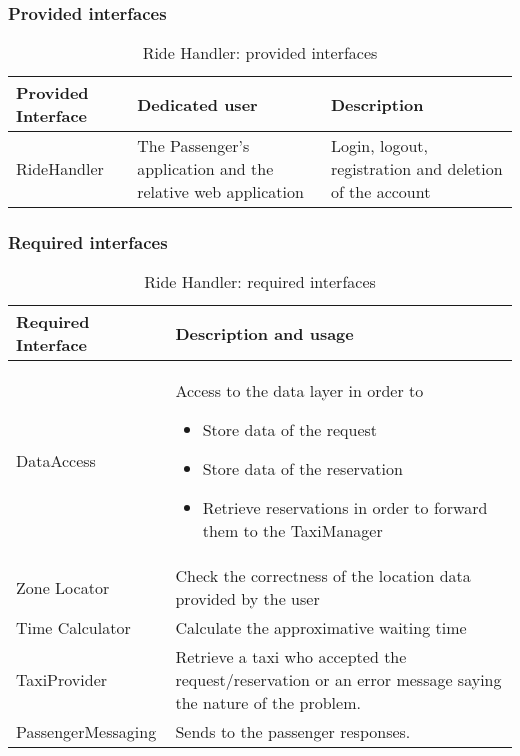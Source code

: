\subsubsection{Provided interfaces}
\begin{table}[H]
\begin{longtable}{| p{} | p{} | p{} |}
\hline
 \textbf{Provided Interface} & \textbf{Dedicated user} & \textbf{Description} \\ \hline
RideHandler & The Passenger's application and the relative web application & Login, logout, registration and deletion of the account \\ \hline
\end{longtable}
\caption{Ride Handler: provided interfaces}
\label{tab:rideHandler:providedInterfaces}
\end{table}
\subsubsection{Required interfaces}
\begin{table}[H]
\begin{longtable}{| l | p{} |}
\hline
 \textbf{Required Interface} & \textbf{Description and usage} \\ \hline
DataAccess & Access to the data layer in order to 
			\begin{itemize}
				\item Store data of the request
				\item Store data of the reservation
				\item Retrieve reservations in order to forward them to the TaxiManager
			\end{itemize} \\ \hline
Zone Locator & Check the correctness of the location data provided by the user \\ \hline
Time Calculator & Calculate the approximative waiting time \\ \hline
TaxiProvider & Retrieve a taxi who accepted the request/reservation or an error message saying the nature of the problem. \\ \hline
PassengerMessaging & Sends to the passenger responses. \\ \hline
\end{longtable}
\caption{Ride Handler: required interfaces}
\label{tab:rideHandler:requiredInterfaces}
\end{table}
